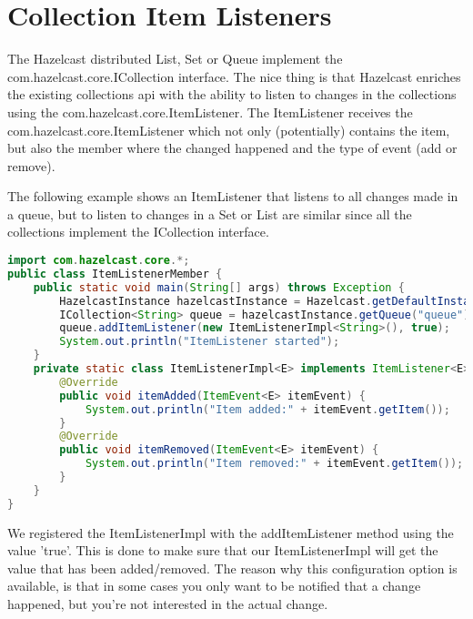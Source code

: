 \section{Collection Item Listeners}
The Hazelcast distributed List, Set or Queue implement the com.hazelcast.core.ICollection interface. The nice thing is that Hazelcast enriches the existing collections api with the ability to listen to changes in the collections using the com.hazelcast.core.ItemListener. The ItemListener receives the com.hazelcast.core.ItemListener which not only (potentially) contains the item, but also the member where the changed happened and the type of event (add or remove).

The following example shows an ItemListener that listens to all changes made in a queue, but to listen to changes in a Set or List are similar since all the collections implement the ICollection interface.
\begin{lstlisting}[language=java]
import com.hazelcast.core.*;
public class ItemListenerMember {
    public static void main(String[] args) throws Exception {
        HazelcastInstance hazelcastInstance = Hazelcast.getDefaultInstance();
        ICollection<String> queue = hazelcastInstance.getQueue("queue");
        queue.addItemListener(new ItemListenerImpl<String>(), true);
        System.out.println("ItemListener started");
    }
    private static class ItemListenerImpl<E> implements ItemListener<E> {
        @Override
        public void itemAdded(ItemEvent<E> itemEvent) {
            System.out.println("Item added:" + itemEvent.getItem());
        }
        @Override
        public void itemRemoved(ItemEvent<E> itemEvent) {
            System.out.println("Item removed:" + itemEvent.getItem());
        }
    }
}
\end{lstlisting}
We registered the ItemListenerImpl with the addItemListener method using the value 'true'. This is done to make sure that our ItemListenerImpl will get the value that has been added/removed. The reason why this configuration option is available, is that in some cases you only want to be notified that a change happened, but you're not interested in the actual change.

